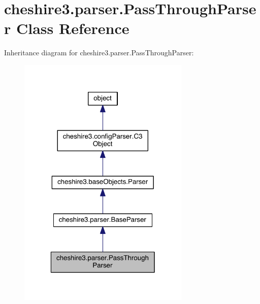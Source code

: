 \hypertarget{classcheshire3_1_1parser_1_1_pass_through_parser}{\section{cheshire3.\-parser.\-Pass\-Through\-Parser Class Reference}
\label{classcheshire3_1_1parser_1_1_pass_through_parser}
}


Inheritance diagram for cheshire3.\-parser.\-Pass\-Through\-Parser\-:
\nopagebreak
\begin{figure}[H]
\begin{center}
\leavevmode
\includegraphics[width=232pt]{classcheshire3_1_1parser_1_1_pass_through_parser__inherit__graph}
\end{center}
\end{figure}


